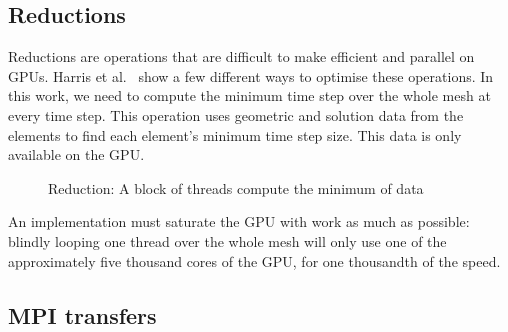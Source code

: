 \subsection{Reductions} \label{subsection:graphics_processing_units:implementation:reductions}

Reductions are operations that are difficult to make efficient and parallel on GPUs. Harris et
al.~\cite{Harris2007} show a few different ways to optimise these operations. In this work, we need
to compute the minimum time step over the whole mesh at every time step. This operation uses
geometric and solution data from the elements to find each element's minimum time step size. This
data is only available on the GPU. 

\begin{figure}[H]
	\centering
	
	\caption{Reduction: A block of threads compute the minimum of data}
	\label{fig:reduction}
\end{figure}

An implementation must saturate the GPU with work as much as possible: blindly looping one thread
over the whole mesh will only use one of the approximately five thousand cores of the GPU, for one
thousandth of the speed. 

\subsection{MPI transfers} \label{subsection:graphics_processing_units:implementation:mpi_transfers}
